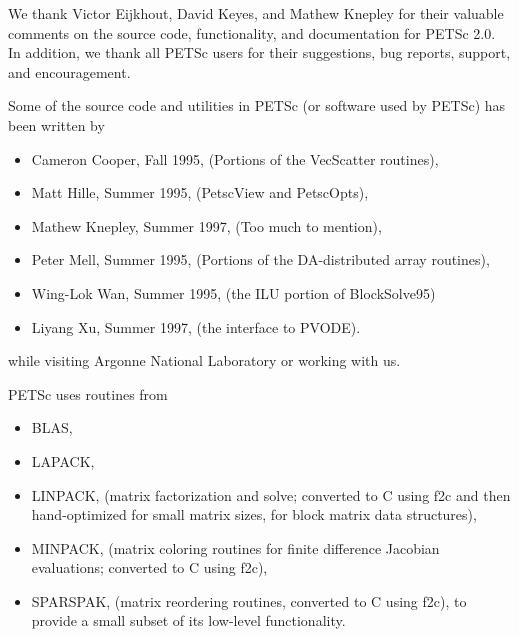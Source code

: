 

\medskip \medskip 
We thank Victor Eijkhout, David Keyes, and Mathew Knepley for their valuable comments on the 
source code, functionality, and documentation  for PETSc 2.0.  
In addition, we thank all PETSc users for
their suggestions, bug reports, support, and encouragement.

\vspace{.3in}
Some of the source code and utilities in PETSc (or software used by PETSc)
has been written by 
\begin{itemize}
  \item Cameron Cooper, Fall 1995, (Portions of the VecScatter routines), 
  \item Matt Hille, Summer 1995, (PetscView and PetscOpts), 
  \item Mathew Knepley, Summer 1997, (Too much to mention),
  \item Peter Mell, Summer 1995, (Portions of the DA-distributed array routines),
  \item Wing-Lok Wan, Summer 1995, (the ILU portion of BlockSolve95)
  \item Liyang Xu, Summer 1997, (the interface to PVODE).
\end{itemize}
while visiting Argonne National Laboratory or working with us.

\vspace{.3in}
PETSc uses routines from 
\begin{itemize}
  \item BLAS, 
  \item LAPACK,
  \item LINPACK,      (matrix factorization and solve; converted to C using f2c and then 
                      hand-optimized for small matrix sizes, for block matrix data structures),
  \item MINPACK,      (matrix coloring routines for finite difference Jacobian evaluations;
                      converted to C using f2c),
  \item SPARSPAK,     (matrix reordering routines, converted to C using f2c),
to provide a small subset of its low-level functionality.
\end{itemize}


